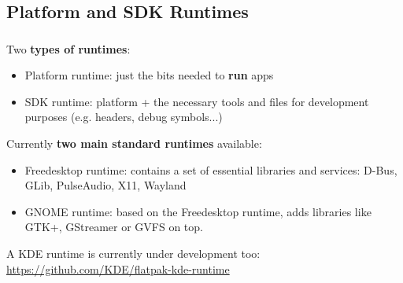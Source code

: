\subsection{Platform and SDK Runtimes}
\begin{frame}
  \frametitle{\insertsubsection}

  Two \textbf{types of runtimes}:
  \begin{itemize}
    \item Platform runtime: just the bits needed to \textbf{run} apps\vspacing
    \item SDK runtime: platform + the necessary tools and files for development purposes (e.g. headers, debug symbols...)\vspacing
    \end{itemize}

  Currently \textbf{two main standard runtimes} available:
  \begin{itemize}
  \item Freedesktop runtime: contains a set of essential libraries and services: D-Bus, GLib, PulseAudio, X11, Wayland\vspacing
  \item GNOME runtime: based on the Freedesktop runtime, adds libraries like GTK+, GStreamer or GVFS on top.
  \end{itemize}

  \begin{center}
    A KDE runtime is currently under development too:\\
    \small{\url{https://github.com/KDE/flatpak-kde-runtime}}\\\vspacing
  \end{center}
\end{frame}

